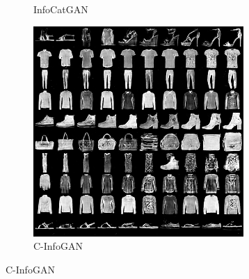 \begin{figure}[htbp]
\begin{subfigure}[b]{\trif\textwidth}
    \caption{InfoCatGAN}
  \end{subfigure}
  \begin{subfigure}[b]{\trif\textwidth}
    \includegraphics[width=\textwidth]{Img/fa-ig.png}
    \caption{C-InfoGAN}
  \end{subfigure}


\end{figure}
